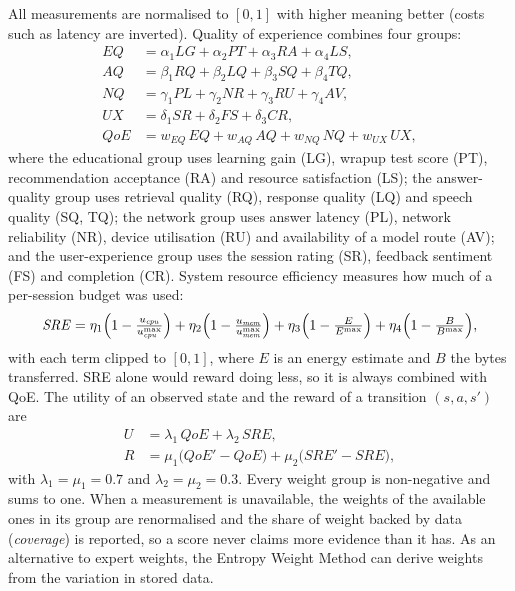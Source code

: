 All measurements are normalised to $[0,1]$ with higher meaning better (costs such as latency are inverted). Quality
of experience combines four groups:
\begin{align}
  \mathit{EQ} &= \alpha_1 \mathit{LG} + \alpha_2 \mathit{PT} + \alpha_3 \mathit{RA} + \alpha_4 \mathit{LS}, \\
  \mathit{AQ} &= \beta_1 \mathit{RQ} + \beta_2 \mathit{LQ} + \beta_3 \mathit{SQ} + \beta_4 \mathit{TQ}, \\
  \mathit{NQ} &= \gamma_1 \mathit{PL} + \gamma_2 \mathit{NR} + \gamma_3 \mathit{RU} + \gamma_4 \mathit{AV}, \\
  \mathit{UX} &= \delta_1 \mathit{SR} + \delta_2 \mathit{FS} + \delta_3 \mathit{CR}, \\
  \mathit{QoE} &= w_{\mathit{EQ}}\,\mathit{EQ} + w_{\mathit{AQ}}\,\mathit{AQ} + w_{\mathit{NQ}}\,\mathit{NQ}
                  + w_{\mathit{UX}}\,\mathit{UX},
\end{align}
where the educational group uses learning gain (LG), wrapup test score (PT), recommendation acceptance (RA) and
resource satisfaction (LS); the answer-quality group uses retrieval quality (RQ), response quality (LQ) and speech
quality (SQ, TQ); the network group uses answer latency (PL), network reliability (NR), device utilisation (RU) and
availability of a model route (AV); and the user-experience group uses the session rating (SR), feedback sentiment
(FS) and completion (CR). System resource efficiency measures how much of a per-session budget was used:
\begin{equation}
  \mathit{SRE} = \eta_1 \Bigl(1-\tfrac{u_{\mathit{cpu}}}{u^{\max}_{\mathit{cpu}}}\Bigr)
               + \eta_2 \Bigl(1-\tfrac{u_{\mathit{mem}}}{u^{\max}_{\mathit{mem}}}\Bigr)
               + \eta_3 \Bigl(1-\tfrac{E}{E^{\max}}\Bigr)
               + \eta_4 \Bigl(1-\tfrac{B}{B^{\max}}\Bigr),
\end{equation}
with each term clipped to $[0,1]$, where $E$ is an energy estimate and $B$ the bytes transferred. SRE alone would
reward doing less, so it is always combined with QoE. The utility of an observed state and the reward of a
transition $(s, a, s')$ are
\begin{align}
  U &= \lambda_1\, \mathit{QoE} + \lambda_2\, \mathit{SRE}, \\
  R &= \mu_1 \bigl(\mathit{QoE}' - \mathit{QoE}\bigr) + \mu_2 \bigl(\mathit{SRE}' - \mathit{SRE}\bigr),
\end{align}
with $\lambda_1 = \mu_1 = 0.7$ and $\lambda_2 = \mu_2 = 0.3$. Every weight group is non-negative and sums to one.
When a measurement is unavailable, the weights of the available ones in its group are renormalised and the share of
weight backed by data (\emph{coverage}) is reported, so a score never claims more evidence than it has. As an
alternative to expert weights, the Entropy Weight Method can derive weights from the variation in stored data.

